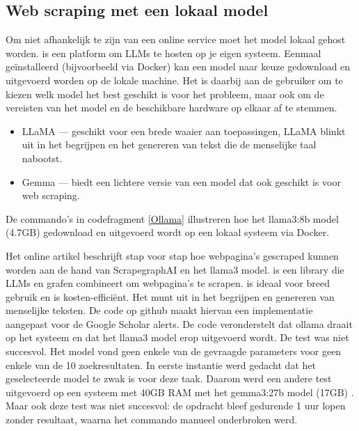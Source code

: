 \subsection{Web scraping met een lokaal model}
Om niet afhankelijk te zijn van een online service moet het model lokaal gehost worden. \textcite{Ollama2025} is een platform om LLMs te hosten op je eigen systeem. Eenmaal geïnstalleerd (bijvoorbeeld via Docker) kan een model naar keuze gedownload en uitgevoerd worden op de lokale machine.
Het is daarbij aan de gebruiker om te kiezen welk model het best geschikt is voor het probleem, maar ook om de vereisten van het model en de beschikbare hardware op elkaar af te stemmen. 
\begin{itemize}
    \item LLaMA — geschikt voor een brede waaier aan toepassingen, LLaMA blinkt uit in het begrijpen en het genereren van tekst die de menselijke taal nabootst.
    \item Gemma — biedt een lichtere versie van een model dat ook geschikt is voor web scraping.
\end{itemize}
De commando's in codefragment \ref{Ollama} illustreren hoe het llama3:8b model (4.7GB) gedownload en uitgevoerd wordt op een lokaal systeem via Docker.
\begin{listing}
    docker exec -it ollama ollama pull llama3:8b
    docker exec -it ollama ollama run llama3
    \caption[Ollama]Ollama}
    \label{Ollama}
\end{listing}
Het online artikel \textcite{Scrapegraphaillama2025} beschrijft stap voor stap hoe webpagina's gescraped kunnen worden aan de hand van ScrapegraphAI en het llama3 model.
\textcite{ScrapeGraphAI2025} is een library die LLMs en grafen combineert om webpagina's te scrapen. \textcite{Llama32025} is ideaal voor breed gebruik en is kosten-efficiënt. Het munt uit in het begrijpen en genereren van menselijke teksten.
De code op github \textcite{Depaepeollama2025} maakt hiervan een implementatie aangepast voor de Google Scholar alerts. De code veronderstelt dat ollama draait op het systeem en dat het llama3 model erop uitgevoerd wordt.
De test was niet succesvol. Het model vond geen enkele van de gevraagde parameters voor geen enkele van de 10 zoekresultaten.
In eerste instantie werd gedacht dat het geselecteerde model te zwak is voor deze taak. Daarom werd een andere test uitgevoerd op een systeem met 40GB RAM met het gemma3:27b model (17GB) \autocite{Gemma32025}. Maar ook deze test was niet succesvol: de opdracht bleef gedurende 1 uur lopen zonder resultaat, waarna het commando manueel onderbroken werd. 

